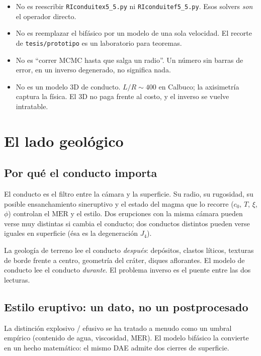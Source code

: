 \documentclass[11pt,a4paper]{article}
\theoremstyle{plain}
\theoremstyle{definition}
\theoremstyle{remark}
\newcommand{\MER}{\mathrm{MER}}
\begin{document}
\begin{itemize}
\item No es reescribir \texttt{RIconduitex5\_5.py} ni
  \texttt{RIconduitef5\_5.py}. Esos solvers \emph{son} el operador
  directo.
\item No es reemplazar el bifásico por un modelo de una sola
  velocidad. El recorte de \texttt{tesis/prototipo} es un
  laboratorio para teoremas.
\item No es ``correr MCMC hasta que salga un radio''. Un número sin
  barras de error, en un inverso degenerado, no significa nada.
\item No es un modelo 3D de conducto. $L/R\sim 400$ en Calbuco; la
  axisimetría captura la física. El 3D no paga frente al costo, y
  el inverso se vuelve intratable.
\end{itemize}

\section{El lado geológico}
\label{sec:geo}

\subsection{Por qué el conducto importa}

El conducto es el filtro entre la cámara y la superficie. Su radio,
su rugosidad, su posible ensanchamiento sineruptivo y el estado del
magma que lo recorre ($c_0$, $T$, $\xi$, $\phi$) controlan el
$\MER$ y el estilo. Dos erupciones con la misma cámara pueden verse
muy distintas si cambia el conducto; dos conductos distintos pueden
verse iguales en superficie (ésa es la degeneración $J_4$).

La geología de terreno lee el conducto \emph{después}: depósitos,
clastos líticos, texturas de borde frente a centro, geometría del
cráter, diques aflorantes. El modelo de conducto lee el conducto
\emph{durante}. El problema inverso es el puente entre las dos
lecturas.

\subsection{Estilo eruptivo: un dato, no un postprocesado}

La distinción explosivo / efusivo se ha tratado a menudo como un
umbral empírico (contenido de agua, viscosidad, $\MER$). El modelo
bifásico la convierte en un hecho matemático: el mismo DAE admite
dos cierres de superficie.
\end{document}
